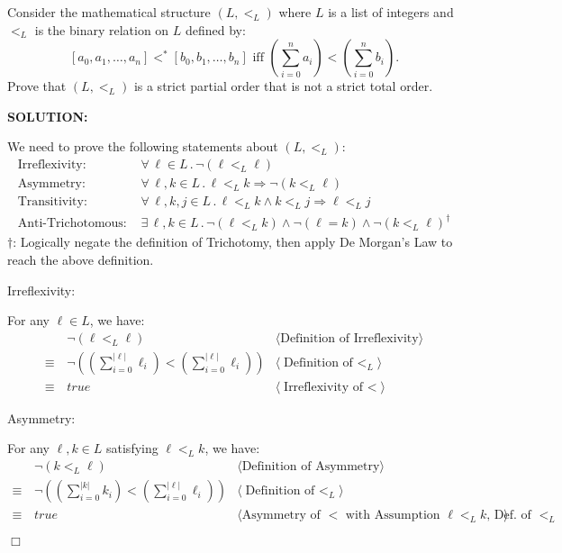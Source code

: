 \documentclass[11pt,fleqn]{article}
\newcommand{\sglsp}{\ }
\newenvironment{proof}{\par\noindent{\bf Proof\sglsp}}{\hfill$\Box$}
\newcommand{\pnote}[1]{{\langle \text{#1} \rangle}}
\begin{document}
  \item Consider the mathematical structure $(L,<_L)$ where $L$ is a
    list of integers and $<_L$ is the binary relation on $L$ defined
    by:
    \[[a_0,a_1,\ldots,a_n] <^* [b_0,b_1,\ldots,b_n] \mbox{  iff  }
      \left(\sum_{i=0}^{n} a_i\right) < \left(\sum_{i=0}^{n}
      b_i\right).\]  Prove that $(L,<_L)$ is a strict partial order
      that is not a strict total order.
      
      \textbf{SOLUTION:}
      
      \begin{proof}
      We need to prove the following statements about $(L, <_L)$:
      \begin{align*}
      \mbox{Irreflexivity: }& \forall\, \ell \in L \,.\, \lnot(\ell <_L \ell)\\ 
      \mbox{Asymmetry: }& \forall\, \ell, k \in L \,.\, \ell <_L k \Rightarrow \lnot(k <_L \ell)\\
      \mbox{Transitivity: }& \forall\, \ell, k, j \in L \,.\, \ell <_L k \land k <_L j \Rightarrow \ell <_L j\\
      \mbox{Anti-Trichotomous: } & \exists\, \ell, k \in L \,.\, \lnot(\ell <_L k) \land \lnot(\ell = k) \land \lnot(k <_L \ell)^\dagger
      \end{align*}
      \footnotesize $\dagger$: Logically negate the definition of Trichotomy, then apply De Morgan's Law to reach the above definition.
      \normalsize
      
      Irreflexivity:
      
      For any $\ell \in L$, we have:
      \begin{align*}
      &\lnot(\ell <_L \ell) &\pnote{Definition of Irreflexivity}\\
      \equiv\,& \lnot\left(\left(\sum_{i=0}^{|\ell|} \ell_i\right) < \left(\sum_{i=0}^{|\ell|} \ell_i\right)\right) & \pnote{Definition of $<_L$}\\
      \equiv\,& true & \pnote{Irreflexivity of $<$}
      \end{align*}
      
      Asymmetry:
      
      For any $\ell, k \in L$ satisfying $\ell <_L k$, we have:
      \begin{align*}
      &\lnot(k <_L \ell) &\pnote{Definition of Asymmetry}\\
      \equiv\,& \lnot\left(\left(\sum_{i=0}^{|k|} k_i\right) < \left(\sum_{i=0}^{|\ell|} \ell_i\right)\right) & \pnote{Definition of $<_L$}\\
      \equiv\,& true & \pnote{Asymmetry of $<$ with Assumption $\ell <_L k$, Def. of $<_L$}
      \end{align*}
      

\end{proof}
\end{document}
